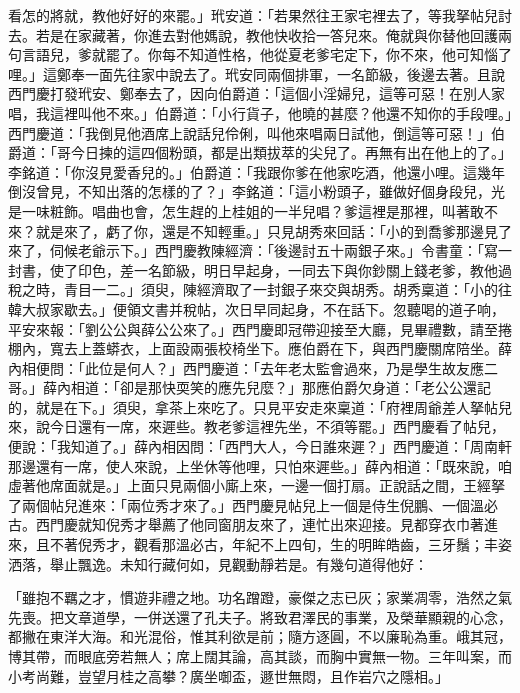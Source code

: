 看怎的將就，教他好好的來罷。」玳安道：「若果然往王家宅裡去了，等我拏帖兒討去。若是在家藏著，你進去對他媽說，教他快收拾一答兒來。俺就與你替他回護兩句言語兒，爹就罷了。你每不知道性格，他從夏老爹宅定下，你不來，他可知惱了哩。」這鄭奉一面先往家中說去了。玳安同兩個排軍，一名節級，後邊去著。且說西門慶打發玳安、鄭奉去了，因向伯爵道：「這個小淫婦兒，這等可惡！在別人家唱，我這裡叫他不來。」伯爵道：「小行貨子，他曉的甚麼？他還不知你的手段哩。」西門慶道：「我倒見他酒席上說話兒伶俐，叫他來唱兩日試他，倒這等可惡！」伯爵道：「哥今日揀的這四個粉頭，都是出類拔萃的尖兒了。再無有出在他上的了。」李銘道：「你沒見愛香兒的。」伯爵道：「我跟你爹在他家吃酒，他還小哩。這幾年倒沒曾見，不知出落的怎樣的了？」李銘道：「這小粉頭子，雖做好個身段兒，光是一味粧飾。唱曲也會，怎生趕的上桂姐的一半兒唱？爹這裡是那裡，叫著敢不來？就是來了，虧了你，還是不知輕重。」只見胡秀來回話：「小的到喬爹那邊見了來了，伺候老爺示下。」西門慶教陳經濟：「後邊討五十兩銀子來。」令書童：「寫一封書，使了印色，差一名節級，明日早起身，一同去下與你鈔關上錢老爹，教他過稅之時，青目一二。」須臾，陳經濟取了一封銀子來交與胡秀。胡秀稟道：「小的往韓大叔家歇去。」便領文書并稅帖，次日早同起身，不在話下。忽聽喝的道子响，平安來報：「劉公公與薛公公來了。」西門慶即冠帶迎接至大廳，見畢禮數，請至捲棚內，寬去上蓋蟒衣，上面設兩張校椅坐下。應伯爵在下，與西門慶關席陪坐。薛內相便問：「此位是何人？」西門慶道：「去年老太監會過來，乃是學生故友應二哥。」薛內相道：「卻是那快耎笑的應先兒麼？」那應伯爵欠身道：「老公公還記的，就是在下。」須臾，拿茶上來吃了。只見平安走來稟道：「府裡周爺差人拏帖兒來，說今日還有一席，來遲些。教老爹這裡先坐，不須等罷。」西門慶看了帖兒，便說：「我知道了。」薛內相因問：「西門大人，今日誰來遲？」西門慶道：「周南軒那邊還有一席，使人來說，上坐休等他哩，只怕來遲些。」薛內相道：「既來說，咱虛著他席面就是。」上面只見兩個小廝上來，一邊一個打扇。正說話之間，王經拏了兩個帖兒進來：「兩位秀才來了。」西門慶見帖兒上一個是侍生倪鵬、一個溫必古。西門慶就知倪秀才舉薦了他同窗朋友來了，連忙出來迎接。見都穿衣巾著進來，且不著倪秀才，觀看那溫必古，年紀不上四旬，生的明眸皓齒，三牙鬚；丰姿洒落，舉止飄逸。未知行藏何如，見觀動靜若是。有幾句道得他好：

「雖抱不羈之才，慣遊非禮之地。功名蹭蹬，豪傑之志已灰；家業凋零，浩然之氣先喪。把文章道學，一併送還了孔夫子。將致君澤民的事業，及榮華顯親的心念，都撇在東洋大海。和光混俗，惟其利欲是前；隨方逐圓，不以廉恥為重。峨其冠，博其帶，而眼底旁若無人；席上闊其論，高其談，而胸中實無一物。三年叫案，而小考尚難，豈望月桂之高攀？廣坐啣盃，遯世無悶，且作岩穴之隱相。」

